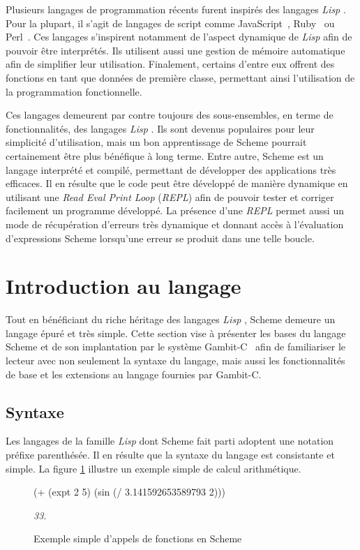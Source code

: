 \documentclass[12pt,oneside,letterpaper,francais]{book}
\newcommand{\lisp}{{\textit{Lisp }}}
\newcommand{\schemeresult}[1]{{\it #1}}
\begin{document}
Plusieurs langages de programmation récents furent inspirés des
langages \lisp. Pour la plupart, il s'agit de langages de script comme
JavaScript~\cite{ECMA-262}, Ruby~\cite{RUBY} ou Perl~\cite{PERL}. Ces
langages s'inspirent notamment de l'aspect dynamique de \lisp afin de
pouvoir être interprétés. Ils utilisent aussi une gestion de mémoire
automatique afin de simplifier leur utilisation. Finalement, certains
d'entre eux offrent des fonctions en tant que données de première
classe, permettant ainsi l'utilisation de la programmation
fonctionnelle.

Ces langages demeurent par contre toujours des sous-ensembles, en
terme de fonctionnalités, des langages \lisp. Ils sont devenus
populaires pour leur simplicité d'utilisation, mais un bon
apprentissage de Scheme pourrait certainement être plus bénéfique à
long terme. Entre autre, Scheme est un langage interprété et compilé,
permettant de développer des applications très efficaces. Il en
résulte que le code peut être développé de manière dynamique en
utilisant une \textit{Read Eval Print Loop} (\textit{REPL}) afin de
pouvoir tester et corriger facilement un programme développé. La
présence d'une \textit{REPL} permet aussi un mode de récupération
d'erreurs très dynamique et donnant accès à l'évaluation d'expressions
Scheme lorsqu'une erreur se produit dans une telle boucle.


\section{Introduction au langage}
Tout en bénéficiant du riche héritage des langages \lisp, Scheme
demeure un langage épuré et très simple. Cette section vise à
présenter les bases du langage Scheme et de son implantation par le
système Gambit-C~\cite{Gambit4} afin de familiariser le lecteur avec
non seulement la syntaxe du langage, mais aussi les fonctionnalités de
base et les extensions au langage fournies par Gambit-C.

\subsection{Syntaxe}
Les langages de la famille \lisp dont Scheme fait parti adoptent une
notation préfixe parenthésée. Il en résulte que la syntaxe du langage
est consistante et simple. La figure \ref{Scheme:simple-ex} illustre
un exemple simple de calcul arithmétique.

\begin{figure}[htb]
  \begin{schemecode}
(+ (expt 2 5) (sin (/ 3.141592653589793 2)))
  \end{schemecode}
  \schemeresult{33.}
  \caption{Exemple simple d'appels de fonctions en Scheme}
  \label{Scheme:simple-ex}
\end{figure}
\end{document}
